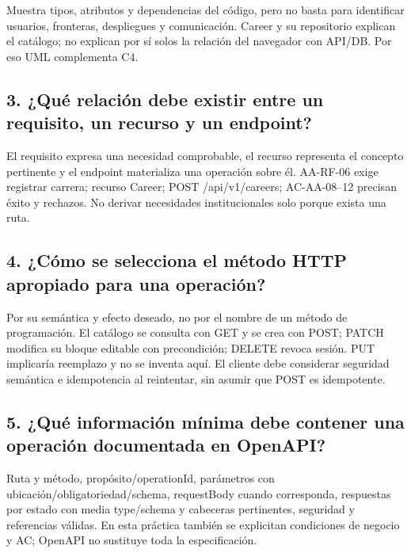 \documentclass[11pt,a4paper]{article}
\begin{document}
Muestra tipos, atributos y dependencias del código, pero no basta para
identificar usuarios, fronteras, despliegues y comunicación. Career y su
repositorio explican el catálogo; no explican por sí solos la relación
del navegador con API/DB. Por eso UML complementa C4.

\subsection{3. ¿Qué relación debe existir entre un requisito, un recurso
y un
endpoint?}\label{informe-3-quuxe9-relaciuxf3n-debe-existir-entre-un-requisito-un-recurso-y-un-endpoint}

El requisito expresa una necesidad comprobable, el recurso representa el
concepto pertinente y el endpoint materializa una operación sobre él.
AA-RF-06 exige registrar carrera; recurso Career; POST /api/v1/careers;
AC-AA-08--12 precisan éxito y rechazos. No derivar necesidades
institucionales solo porque exista una ruta.

\subsection{4. ¿Cómo se selecciona el método HTTP apropiado para una
operación?}\label{informe-4-cuxf3mo-se-selecciona-el-muxe9todo-http-apropiado-para-una-operaciuxf3n}

Por su semántica y efecto deseado, no por el nombre de un método de
programación. El catálogo se consulta con GET y se crea con POST; PATCH
modifica su bloque editable con precondición; DELETE revoca sesión. PUT
implicaría reemplazo y no se inventa aquí. El cliente debe considerar
seguridad semántica e idempotencia al reintentar, sin asumir que POST es
idempotente.

\subsection{5. ¿Qué información mínima debe contener una operación
documentada en
OpenAPI?}\label{informe-5-quuxe9-informaciuxf3n-muxednima-debe-contener-una-operaciuxf3n-documentada-en-openapi}

Ruta y método, propósito/operationId, parámetros con
ubicación/obligatoriedad/schema, requestBody cuando corresponda,
respuestas por estado con media type/schema y cabeceras pertinentes,
seguridad y referencias válidas. En esta práctica también se explicitan
condiciones de negocio y AC; OpenAPI no sustituye toda la
especificación.
\end{document}
